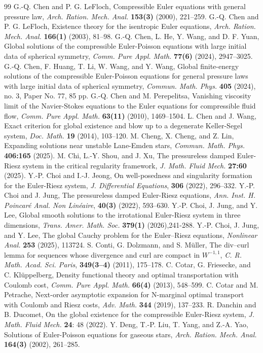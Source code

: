 \documentclass[reqno,11pt]{amsart}
\numberwithin{equation}{section}
\theoremstyle{definition}
\begin{document}
\begin{thebibliography}{99}
 G.-Q. Chen and P. G. LeFloch,
 Compressible Euler equations with general pressure law,
 {\em Arch. Ration. Mech. Anal.} {\bf 153(3)} (2000), 221--259.
 G.-Q. Chen and P. G. LeFloch,
 Existence theory for the isentropic Euler equations,
 {\em Arch. Ration. Mech. Anal.} {\bf 166(1)} (2003), 81--98.
G.-Q. Chen, L. He, Y. Wang, and D. F. Yuan, Global solutions of the compressible Euler-Poisson equations 
with large initial data of spherical symmetry, {\em Comm. Pure Appl. Math.} {\bf 77(6)} (2024), 2947--3025.
 G.-Q. Chen, F. Huang, T. Li, W. Wang, and Y. Wang,
 Global finite-energy solutions of the compressible Euler-Poisson equations for general pressure laws 
 with large initial data of spherical symmetry,
 {\em Commun. Math. Phys.} {\bf 405} (2024), no. 3, Paper No. 77, 85 pp.
 G.-Q. Chen and M. Perepelitsa,
 Vanishing viscosity limit of the Navier-Stokes equations to the Euler equations for compressible fluid flow,
 {\em Comm. Pure Appl. Math.} {\bf 63(11)} (2010), 1469--1504.
 L. Chen and J. Wang,
 Exact criterion for global existence and blow up to a degenerate Keller-Segel system,
 {\em Doc. Math.} {\bf 19} (2014), 103--120.
 M. Cheng, X. Cheng, and Z. Lin,
 Expanding solutions near unstable Lane-Emden stars,
 {\em Commun. Math. Phys.} {\bf 406:165} (2025).
 M. Chi, L.-Y. Shou, and J. Xu,
 The pressureless damped Euler-Riesz system in the critical regularity framework,
 {\em J. Math. Fluid Mech.} {\bf 27:60} (2025). 
 Y.-P. Choi and I.-J. Jeong,
 On well-posedness and singularity formation for the Euler-Riesz system,
 {\em J. Differential Equations}, {\bf 306} (2022), 296--332.
 Y.-P. Choi and J. Jung,
 The pressureless damped Euler-Riesz equations,
 {\em Ann. Inst. H. Poincaré Anal. Non Linéaire}, {\bf 40(3)} (2022), 593--630.
 Y.-P. Choi, J. Jung, and Y. Lee,
 Global smooth solutions to the irrotational Euler-Riesz system in three dimensions,
 {\em Trans. Amer. Math. Soc.} {\bf 379(1)} (2026),241-288.
 Y.-P. Choi, J. Jung, and Y. Lee,
 The global Cauchy problem for the Euler--Riesz equations,
 {\em Nonlinear Anal.} {\bf 253} (2025), 113724.
 S. Conti, G. Dolzmann, and S. Müller,
 The div--curl lemma for sequences whose divergence and curl are compact in $W^{-1,1}$,
 {\em C. R. Math. Acad. Sci. Paris}, {\bf 349(3--4)} (2011), 175--178.
 C. Cotar, G. Friesecke, and C. Kl\"{u}ppelberg, Density functional theory and 
 optimal transportation with Coulomb cost, {\em Comm. Pure Appl. Math.} {\bf 66(4)} (2013), 548--599.
 C. Cotar and M. Petrache, Next-order asymptotic expansion for N-marginal optimal transport
with Coulomb and Riesz costs, {\em Adv. Math.} {\bf 344} (2019), 137--233.
 R. Danchin and B. Ducomet, On the global existence for the compressible Euler-Riesz system, 
 {\em J. Math. Fluid Mech.} {\bf 24}: 48 (2022).
 Y. Deng, T.-P. Liu, T. Yang, and Z.-A. Yao,
 Solutions of Euler-Poisson equations for gaseous stars,
 {\em Arch. Ration. Mech. Anal.} {\bf 164(3)} (2002), 261--285.


\end{thebibliography}
\end{document}

